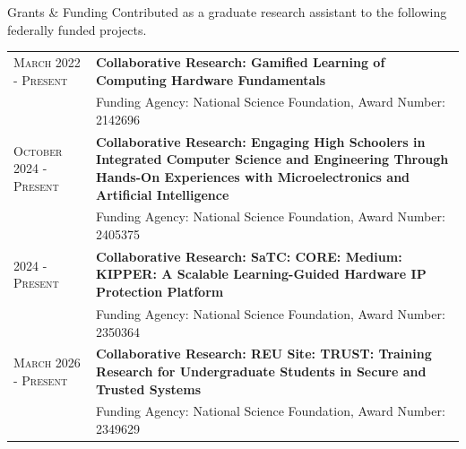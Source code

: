 \begin{rSection}{Grants \& Funding}
Contributed as a graduate research assistant to the following federally funded projects.

\begin{tabular}{lp{14.5cm}}
    \textsc{March 2022 - Present} & \textbf{Collaborative Research: Gamified Learning of Computing Hardware Fundamentals} \\
                      & Funding Agency: National Science Foundation, Award Number:	2142696\\

    \textsc{October 2024 - Present} & \textbf{Collaborative Research: Engaging High Schoolers in Integrated Computer Science and Engineering Through Hands-On Experiences with Microelectronics and Artificial Intelligence} \\
                      & Funding Agency: National Science Foundation, Award Number:	2405375\\

    \textsc{2024 - Present} & \textbf{Collaborative Research: SaTC: CORE: Medium: KIPPER: A Scalable Learning-Guided Hardware IP Protection Platform} \\
                      & Funding Agency: National Science Foundation, Award Number:	2350364\\

    \textsc{March 2026 - Present} & \textbf{Collaborative Research: REU Site: TRUST: Training Research for Undergraduate Students in Secure and Trusted Systems} \\
                      & Funding Agency: National Science Foundation, Award Number:	2349629\\

\end{tabular}


\end{rSection}
